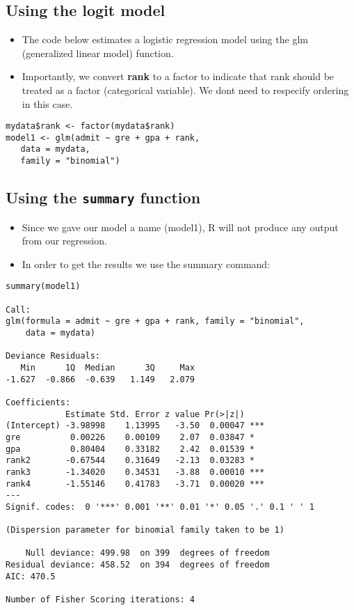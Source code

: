 \subsection{Using the logit model}
\begin{itemize}
\item The code below estimates a logistic regression model using the glm (generalized linear model) function. \item Importantly, we convert \textbf{rank} to a factor to indicate that rank should be treated as a factor (categorical variable). We dont need to respecify ordering in this case.
\end{itemize}

\begin{framed}
\begin{verbatim}
mydata$rank <- factor(mydata$rank)
model1 <- glm(admit ~ gre + gpa + rank, 
   data = mydata, 
   family = "binomial")
\end{verbatim}
\end{framed}
\subsection{Using the \texttt{summary} function}
\begin{itemize}
\item Since we gave our model a name (model1), R will not produce any output from our regression. 
\item In order to get the results we use the summary command:
\end{itemize}
\begin{framed}
\begin{verbatim}
summary(model1)

Call:
glm(formula = admit ~ gre + gpa + rank, family = "binomial", 
    data = mydata)

Deviance Residuals: 
   Min      1Q  Median      3Q     Max  
-1.627  -0.866  -0.639   1.149   2.079  

Coefficients:
            Estimate Std. Error z value Pr(>|z|)    
(Intercept) -3.98998    1.13995   -3.50  0.00047 ***
gre          0.00226    0.00109    2.07  0.03847 *  
gpa          0.80404    0.33182    2.42  0.01539 *  
rank2       -0.67544    0.31649   -2.13  0.03283 *  
rank3       -1.34020    0.34531   -3.88  0.00010 ***
rank4       -1.55146    0.41783   -3.71  0.00020 ***
---
Signif. codes:  0 '***' 0.001 '**' 0.01 '*' 0.05 '.' 0.1 ' ' 1

(Dispersion parameter for binomial family taken to be 1)

    Null deviance: 499.98  on 399  degrees of freedom
Residual deviance: 458.52  on 394  degrees of freedom
AIC: 470.5

Number of Fisher Scoring iterations: 4
\end{verbatim}
\end{framed}
